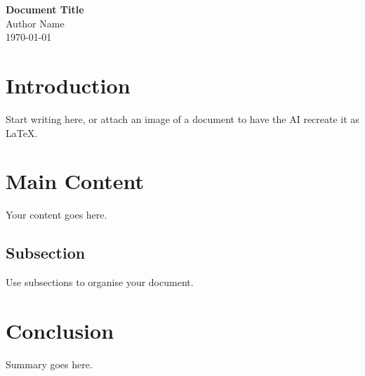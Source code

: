 \documentclass[12pt,a4paper]{article}
\begin{document}
\begin{center}
  {\LARGE\bfseries Document Title}\\[6pt]
  {\large Author Name}\\[4pt]
  {\normalsize \today}
\end{center}

\vspace{1.5em}

\section{Introduction}
Start writing here, or attach an image of a document to have the AI recreate it as LaTeX.

\section{Main Content}
Your content goes here.

\subsection{Subsection}
Use subsections to organise your document.

\section{Conclusion}
Summary goes here.
\end{document}

